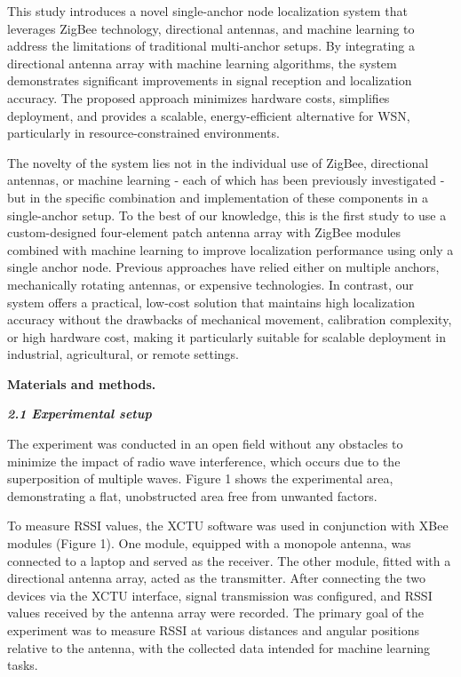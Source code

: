 \begin{multicols}{2}
This study introduces a novel single-anchor node localization system
that leverages ZigBee technology, directional antennas, and machine
learning to address the limitations of traditional multi-anchor setups.
By integrating a directional antenna array with machine learning
algorithms, the system demonstrates significant improvements in signal
reception and localization accuracy. The proposed approach minimizes
hardware costs, simplifies deployment, and provides a scalable,
energy-efficient alternative for WSN, particularly in
resource-constrained environments.

The novelty of the system lies not in the individual use of ZigBee,
directional antennas, or machine learning - each of which has been
previously investigated - but in the specific combination and
implementation of these components in a single-anchor setup. To the best
of our knowledge, this is the first study to use a custom-designed
four-element patch antenna array with ZigBee modules combined with
machine learning to improve localization performance using only a single
anchor node. Previous approaches have relied either on multiple anchors,
mechanically rotating antennas, or expensive technologies. In contrast,
our system offers a practical, low-cost solution that maintains high
localization accuracy without the drawbacks of mechanical movement,
calibration complexity, or high hardware cost, making it particularly
suitable for scalable deployment in industrial, agricultural, or remote
settings.

{\bfseries Materials and methods.}

\emph{{\bfseries 2.1 Experimental setup}}

The experiment was conducted in an open field without any obstacles to
minimize the impact of radio wave interference, which occurs due to the
superposition of multiple waves. Figure 1 shows the experimental area,
demonstrating a flat, unobstructed area free from unwanted factors.

To measure RSSI values, the XCTU software was used in conjunction with
XBee modules (Figure 1). One module, equipped with a monopole antenna,
was connected to a laptop and served as the receiver. The other module,
fitted with a directional antenna array, acted as the transmitter. After
connecting the two devices via the XCTU interface, signal transmission
was configured, and RSSI values received by the antenna array were
recorded. The primary goal of the experiment was to measure RSSI at
various distances and angular positions relative to the antenna, with
the collected data intended for machine learning tasks.
\end{multicols}

